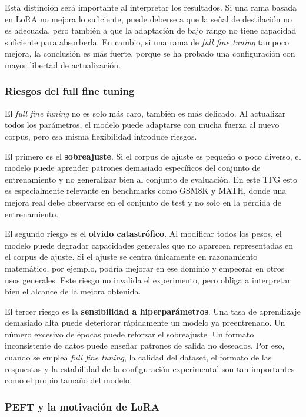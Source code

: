 Esta distinción será importante al interpretar los resultados. Si una rama basada en LoRA no mejora lo suficiente, puede deberse a que la señal de destilación no es adecuada, pero también a que la adaptación de bajo rango no tiene capacidad suficiente para absorberla. En cambio, si una rama de \textit{full fine tuning} tampoco mejora, la conclusión es más fuerte, porque se ha probado una configuración con mayor libertad de actualización.

\subsubsection{Riesgos del full fine tuning}

El \textit{full fine tuning} no es solo más caro, también es más delicado. Al actualizar todos los parámetros, el modelo puede adaptarse con mucha fuerza al nuevo corpus, pero esa misma flexibilidad introduce riesgos.

El primero es el \textbf{sobreajuste}. Si el corpus de ajuste es pequeño o poco diverso, el modelo puede aprender patrones demasiado específicos del conjunto de entrenamiento y no generalizar bien al conjunto de evaluación. En este TFG esto es especialmente relevante en benchmarks como GSM8K y MATH, donde una mejora real debe observarse en el conjunto de test y no solo en la pérdida de entrenamiento.

El segundo riesgo es el \textbf{olvido catastrófico}. Al modificar todos los pesos, el modelo puede degradar capacidades generales que no aparecen representadas en el corpus de ajuste. Si el ajuste se centra únicamente en razonamiento matemático, por ejemplo, podría mejorar en ese dominio y empeorar en otros usos generales. Este riesgo no invalida el experimento, pero obliga a interpretar bien el alcance de la mejora obtenida.

El tercer riesgo es la \textbf{sensibilidad a hiperparámetros}. Una tasa de aprendizaje demasiado alta puede deteriorar rápidamente un modelo ya preentrenado. Un número excesivo de épocas puede reforzar el sobreajuste. Un formato inconsistente de datos puede enseñar patrones de salida no deseados. Por eso, cuando se emplea \textit{full fine tuning}, la calidad del dataset, el formato de las respuestas y la estabilidad de la configuración experimental son tan importantes como el propio tamaño del modelo.

\subsubsection{PEFT y la motivación de LoRA}

